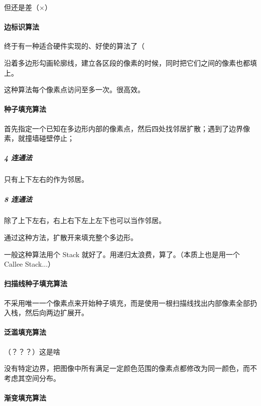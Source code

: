 \documentclass[
]{article}
\begin{document}
但还是差（×）

\hypertarget{header-n39}{%
\paragraph{边标识算法}\label{header-n39}}

终于有一种适合硬件实现的、好使的算法了（

沿着多边形勾画轮廓线，建立各区段的像素的时候，同时把它们之间的像素也都填上。

这种算法每个像素点访问至多一次。很高效。

\hypertarget{header-n43}{%
\paragraph{种子填充算法}\label{header-n43}}

首先指定一个已知在多边形内部的像素点，然后四处找邻居扩散；遇到了边界像素，就撞墙碰壁停止；

\hypertarget{header-n45}{%
\subparagraph{4 连通法}\label{header-n45}}

只有上下左右的作为邻居。

\hypertarget{header-n47}{%
\subparagraph{8 连通法}\label{header-n47}}

除了上下左右，右上右下左上左下也可以当作邻居。

通过这种方法，扩散开来填充整个多边形。

一般这种算法用个 Stack 就好了。用递归太浪费，算了。（本质上也是用一个
Callee Stack...）

\hypertarget{header-n51}{%
\paragraph{扫描线种子填充算法}\label{header-n51}}

不采用唯一一个像素点来开始种子填充，而是使用一根扫描线找出内部像素全部扔入栈，然后向两边扩展开。

\hypertarget{header-n53}{%
\paragraph{泛滥填充算法}\label{header-n53}}

（？？？）这是啥

没有特定边界，把图像中所有满足一定颜色范围的像素点都修改为同一颜色，而不考虑其空间分布。

\hypertarget{header-n56}{%
\paragraph{渐变填充算法}\label{header-n56}}
\end{document}
